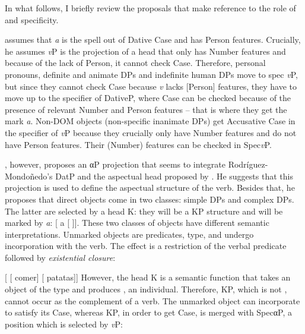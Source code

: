 \documentclass[output=paper]{langsci/langscibook}
\begin{document}
In what follows, I briefly review the proposals that make reference to the role
of  and specificity.

\citet{Rodriguez-Mondonedo2007} assumes that \emph{a} is the spell out of
Dative Case and has Person features. Crucially, he assumes \emph{v}P is the
projection of a head that only has Number features and because of the lack of
Person, it cannot check Case. Therefore, personal pronouns, definite and
animate DPs and indefinite human DPs move to spec \emph{v}P, but since they
cannot check Case because \emph{v} lacks [Person] features, they have to move
up to the specifier of DativeP, where Case can be checked because of the
presence of relevant Number and Person features -- that is where they get the
mark \emph{a}. Non-DOM objects (non-specific inanimate DPs) get Accusative Case
in the specifier of \emph{v}P because they crucially only have Number features
and do not have Person features. Their (Number) features
can be checked in Spec\emph{v}P.

\textcite{Lopez2012}, however, proposes an αP projection that seems to
integrate Rod\-rí\-guez-Mondoñedo's DatP and the aspectual head proposed by
\citet{Torrego1998}. He suggests that this projection is used to define the
aspectual structure of the verb. Besides that, he proposes that direct objects
come in two classes: simple DPs and complex DPs. The latter are selected by a
head K: they will be a KP structure and will be marked by \emph{a}: [ a
[ ]]. These two classes of objects have different semantic
interpretations. Unmarked objects are predicates,  type, and undergo
incorporation with the verb. The effect is a restriction of the verbal
predicate followed by \emph{existential closure}:

\ea\label{ex:27.17}
    [ [ comer] [ patatas]]
\z
However, the head K is a semantic function that takes an object of the type
 and produces , an individual. Therefore, KP, which is not ,
cannot occur as the complement of a verb. The unmarked object  can
incorporate to satisfy its Case, whereas KP, in order to get Case, is merged
with SpecαP, a position which is selected by \emph{v}P:
\end{document}
